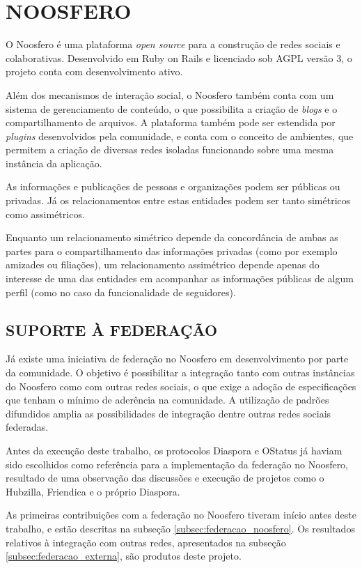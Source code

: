 \chapter{NOOSFERO}

O Noosfero é uma plataforma \textit{open source} para a construção de redes sociais
e colaborativas. Desenvolvido em Ruby on Rails e licenciado sob AGPL versão 3, o
projeto conta com desenvolvimento ativo.

Além dos mecanismos de interação social, o Noosfero também conta com um sistema de
gerenciamento de conteúdo, o que possibilita a criação de \textit{blogs} e o
compartilhamento de arquivos. A plataforma também pode ser estendida por
\textit{plugins} desenvolvidos pela comunidade, e conta com o conceito de ambientes,
que permitem a criação de diversas redes isoladas funcionando sobre uma mesma
instância da aplicação.

As informações e publicações de pessoas e organizações podem ser públicas ou
privadas. Já os relacionamentos entre estas entidades podem ser tanto simétricos
como assimétricos.

Enquanto um relacionamento simétrico depende da concordância de ambas as partes para
o compartilhamento das informações privadas (como por exemplo amizades ou
filiações), um relacionamento assimétrico depende apenas do interesse de uma das
entidades em acompanhar as informações públicas de algum perfil (como no caso da
funcionalidade de seguidores).



\section{SUPORTE À FEDERAÇÃO}

Já existe uma iniciativa de federação no Noosfero em desenvolvimento por parte da
comunidade. O objetivo é possibilitar a integração tanto com outras instâncias do
Noosfero como com outras redes sociais, o que exige a adoção de especificações que
tenham o mínimo de aderência na comunidade. A utilização de padrões difundidos
amplia as possibilidades de integração dentre outras redes sociais federadas.

Antes da execução deste trabalho, os protocolos Diaspora e OStatus já haviam sido
escolhidos como referência para a implementação da federação no Noosfero, resultado
de uma observação das discussões e execução de projetos como o Hubzilla, Friendica e
o próprio Diaspora.

As primeiras contribuições com a federação no Noosfero tiveram início antes deste
trabalho, e estão descritas na subseção \ref{subsec:federacao_noosfero}. Os
resultados relativos à integração com outras redes, apresentados na subseção
\ref{subsec:federacao_externa}, são produtos deste projeto.


